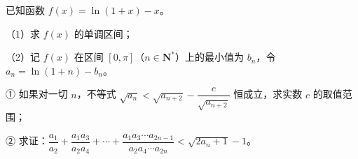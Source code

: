 \begin{question}
已知函数 $f(x)=\ln(1+x)-x$。

（1）求 $f(x)$ 的单调区间；

（2）记 $f(x)$ 在区间 $[0,\pi]$（$n\in\mathbf N^*$）上的最小值为 $b_n$，令 $a_n=\ln(1+n)-b_n$。

① 如果对一切 $n$，不等式 $\sqrt{a_n}<\sqrt{a_{n+2}}-\dfrac{c}{\sqrt{a_{n+2}}}$ 恒成立，求实数 $c$ 的取值范围；

② 求证：$\dfrac{a_1}{a_2}+\dfrac{a_1a_3}{a_2a_4}+\cdots+\dfrac{a_1a_3\cdots a_{2n-1}}{a_2a_4\cdots a_{2n}}<\sqrt{2a_n+1}-1$。

\end{question}